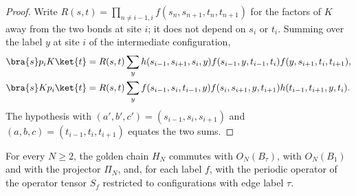 \begin{proof}
    \leanok
    Write $R(s,t)=\prod_{n\neq i-1,i}f(s_n,s_{n+1},t_n,t_{n+1})$ for the
    factors of $K$ away from the two bonds at site $i$; it does not depend
    on $s_i$ or $t_i$. Summing over the label $y$ at site $i$ of the
    intermediate configuration,
    \begin{align}
        \bra{s}p_iK\ket{t}
         & =R(s,t)\sum_yh(s_{i-1},s_{i+1},s_i,y)
        f(s_{i-1},y,t_{i-1},t_i)f(y,s_{i+1},t_i,t_{i+1}),
        \notag                                   \\
        \bra{s}Kp_i\ket{t}
         & =R(s,t)\sum_yf(s_{i-1},s_i,t_{i-1},y)
        f(s_i,s_{i+1},y,t_{i+1})h(t_{i-1},t_{i+1},y,t_i).
        \notag
    \end{align}
    The hypothesis with $(a',b',c')=(s_{i-1},s_i,s_{i+1})$ and
    $(a,b,c)=(t_{i-1},t_i,t_{i+1})$ equates the two sums.
\end{proof}

\begin{lemma}%
    \label{thm:asymex_fib_golden_chain}
    \leanok
    For every $N\geq2$, the golden chain $H_N$ commutes with $O_N(B_\tau)$,
    with $O_N(B_1)$ and with the projector $\Pi_N$, and, for each label $f$,
    with the periodic operator of the operator tensor $S_f$ restricted to
    configurations with edge label $\tau$.
\end{lemma}

